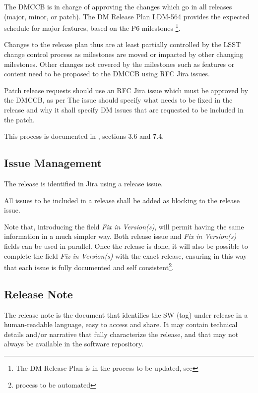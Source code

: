 The DMCCB is in charge of approving the changes which go in all releases (major, minor, or patch).
The DM Release Plan LDM-564 provides the expected schedule for major features, based on the P6 milestones \footnote{The DM Release Plan is in the process to be updated, see }.

Changes to the release plan thus are at least partially controlled by the LSST change control process as milestones are moved or impacted by other changing milestones. 
Other changes not covered by the milestones such as features or content need to be proposed to the DMCCB using RFC Jira issues.

Patch release requests should use an RFC Jira issue which must be approved by the DMCCB, as per 
The issue should specify what needs to be fixed in the release and why it shall specify DM issues that are requested to be included in the patch.

This process is documented in , sections 3.6 and 7.4.


\subsection{Issue Management} \label{sec:issues}

The release is identified in Jira using a release issue.

All issues to be included in a release shall be added as blocking to the release issue.

Note that, introducing the field \textit{Fix in Version(s)}, will permit having the same information in a much simpler way.
Both release issue and \textit{Fix in Version(s)} fields can be used in parallel.
Once the release is done, it will also be possible to complete the field \textit{Fix in Version(s)} with the exact release,
ensuring in this way that each issue is fully documented and self consistent\footnote{process to be automated}.


\subsection{Release Note} \label{sec:relnote}

The release note is the document that identifies the SW (tag) under release in a human-readable language, easy to access and share. 
It may contain technical details and/or narrative that fully characterize the release, and that may not always be available in the software repository.

